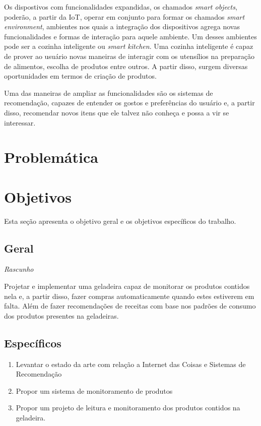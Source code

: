 
Os dispostivos com funcionalidades expandidas, os chamados \textit{smart objects}, poderão, a partir da IoT, operar em conjunto para formar os chamados \textit{smart environment}, ambientes nos quais a integração dos dispositivos agrega novas funcionalidades e formas de interação para aquele ambiente. Um desses ambientes pode ser a cozinha inteligente ou \textit{smart kitchen}. Uma cozinha inteligente é capaz de prover ao usuário novas maneiras de interagir com os utensílios na preparação de alimentos, escolha de produtos entre outros. A partir disso, surgem diversas oportunidades em termos de criação de produtos.

Uma das maneiras de ampliar as funcionalidades são os sistemas de recomendação, capazes de entender os gostos e preferências do usuário e, a partir disso, recomendar novos itens que ele talvez não conheça e possa a vir se interessar.



\section{Problemática}


\section{Objetivos}

Esta seção apresenta o objetivo geral e os objetivos específicos do trabalho.

\subsection{Geral}

\textit{Rascunho}

Projetar e implementar uma geladeira capaz de monitorar os produtos contidos nela e, a partir disso, fazer compras automaticamente quando estes estiverem em falta.
Além de fazer recomendações de receitas com base nos padrões de consumo dos produtos presentes na geladeiras.


\subsection{Específicos}
\begin{enumerate}
	\item Levantar o estado da arte com relação a Internet das Coisas e Sistemas de Recomendação
	\item Propor um sistema de monitoramento de produtos 
	\item Propor um projeto de leitura e monitoramento dos produtos contidos na geladeira.
\end{enumerate}

